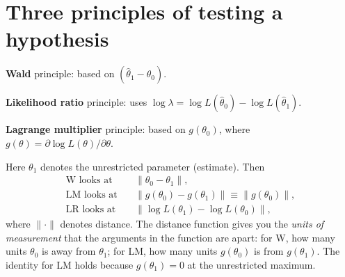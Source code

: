 \documentclass[11pt]{article}
\begin{document}
\section{Three principles of testing a hypothesis}

\begin{figure}[h]
\centering
{}
\end{figure}

\begin{flatnum}
 \item \textbf{Wald} principle: based on $(\hat\theta_{1}-\theta_{0})$.
 \item \textbf{Likelihood ratio} principle: uses $\log\lambda=\log L(\hat\theta_{0})-\log L(\hat\theta_{1})$.
 \item \textbf{Lagrange multiplier} principle: based on $g(\theta_{0})$, where
       $g(\theta)=\partial\log L(\theta)/\partial\theta$.
\end{flatnum}

Here $\theta_{1}$ denotes the unrestricted parameter (estimate). Then
\begin{align*}
 \text{W looks at}\quad&\lVert\theta_{0}-\theta_{1}\rVert,\\
 \text{LM looks at}\quad&\lVert g(\theta_{0})-g(\theta_{1})\rVert\equiv\lVert g(\theta_{0})\rVert,\\
 \text{LR looks at}\quad&\lVert\log L(\theta_{1})-\log L(\theta_{0})\rVert,
\end{align*}
where $\lVert\cdot\rVert$ denotes distance. The distance function gives you the \emph{units of
measurement} that the arguments in the function are apart: for W, how many units $\theta_{0}$ is away
from $\theta_{1}$; for LM, how many units $g(\theta_{0})$ is from $g(\theta_{1})$. The identity for LM holds
because $g(\theta_{1})=0$ at the unrestricted maximum.
\end{document}
